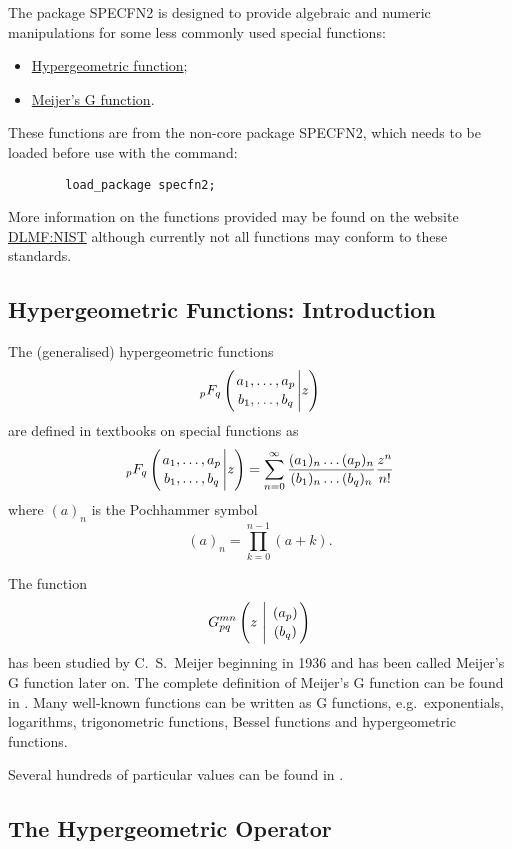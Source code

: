 \hypertarget{SPECFNS2}{}

The package SPECFN2 is designed to provide algebraic and numeric manipulations
for some less commonly used special functions:
\begin{itemize}
\item \hyperlink{operator:HYPERGEOMETRIC}{Hypergeometric function};
\item \hyperlink{operator:MEIJERG}{Meijer's G function}.
\end{itemize}

These functions are from the non-core package SPECFN2, which
needs to be loaded before use with the command:
\begin{verbatim}
        load_package specfn2;
\end{verbatim}

More information on the functions provided may be found on the website
\href{https://dlmf.nist.gov/}{DLMF:NIST} although currently not all functions
may conform to these standards.

\subsection{Hypergeometric Functions: Introduction}
The (generalised) hypergeometric functions
\[
_pF_q \left( \genfrac{}{}{0pt}{}{a_1, \ldots , a_p}{b_1, \ldots ,b_q} \Bigg\vert z \right)
\]
are defined in textbooks on special functions as
\[
_pF_q \left( \genfrac{}{}{0pt}{}{a_1, \ldots , a_p}{b_1, \ldots ,b_q} \Bigg\vert z \right)
  = \sum_{n=0}^{\infty}\frac{(a_{1})_{n}\dots(a_{p})_{n}}{(b_{1})_{n}\dots(b_{q})_{n}}\frac{z^{n}}{n!}
\]
where $(a)_{n}$ is the Pochhammer symbol
\[
 (a)_{n} = \prod_{k=0}^{n-1} (a+k).
\]

The function 
\[
G_{p q}^{m n} \left( z \  \Bigg\vert \  \genfrac{}{}{0pt}{}{(a_p)}{(b_q)} \right)
\]
has been studied by C.~S.~Meijer beginning in 1936 and has been
called Meijer's G function later on. The complete definition of Meijer's
G function can be found in \cite{Prudnikov:90c}.
Many well-known functions can be written as G functions,
e.g.\ exponentials, logarithms, trigonometric functions, Bessel functions
and hypergeometric functions.

Several hundreds of particular values can be found in \cite{Prudnikov:90c}.

\hypertarget{operator:HYPERGEOMETRIC}{}
\subsection{The Hypergeometric Operator}

